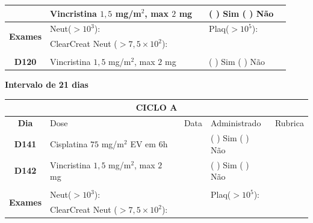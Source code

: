 \documentclass[11pt,a4paper,oldfontcommands]{memoir}
\begin{document}
\begin{center}
\begin{longtable}{p{1cm}p{6cm}|p{1cm}|p{3cm}|p{2.5cm}}
    \multicolumn{1}{c|}{\multirow{1}{*}{\textbf{}}}&{Vincristina \(1,5\) mg/m\(^2\), max \(2\) mg}&&{(  ) Sim (  ) Não}&\\
    \hline
    \multicolumn{1}{c|}{\multirow{2}{*}{\textbf{Exames}}}&\multicolumn{2}{l|}{Neut(\(>10^3\)):}&{Plaq(\(>10^5\)):}&\\
    \cline{2-5}
    \multicolumn{1}{c|}{\multirow{2}{*}{{}}}&\multicolumn{2}{l|}{ClearCreat Neut (\(>7,5\times10^2\)):}&{}&{}\\
    \hline
    \\
    \hline
    \multicolumn{1}{c|}{\multirow{1}{*}{\textbf{D120}}}&{Vincristina \(1,5\) mg/m\(^2\), max \(2\) mg}&&{(  ) Sim (  ) Não}&\\
    \hline
\end{longtable}
\textbf{Intervalo de 21 dias}
\begin{longtable}{p{1cm}p{6cm}|p{1cm}|p{3cm}|p{2.5cm}}
	\hline
	\multicolumn{5}{c}{\textbf{CICLO A}}\\
\hline
    \multicolumn{1}{c|}{\multirow{1}{*}{\textbf{Dia}}}&{Dose}&{Data}&{Administrado}&{Rubrica} \\
    \hline
    \multicolumn{1}{c|}{\multirow{1}{*}{\textbf{D141}}}&{Cisplatina \(75\) mg/m\(^2\) EV em 6h}&&{(  ) Sim (  ) Não}&\\
    \multicolumn{1}{c|}{\multirow{1}{*}{\textbf{D142}}}&{Vincristina \(1,5\) mg/m\(^2\), max \(2\) mg}&&{(  ) Sim (  ) Não}&\\
    \multicolumn{1}{c|}{\multirow{1}{*}{\textbf{}}}&&&&\\
    \hline
    \multicolumn{1}{c|}{\multirow{2}{*}{\textbf{Exames}}}&\multicolumn{2}{l|}{Neut(\(>10^3\)):}&{Plaq(\(>10^5\)):}&\\
    \cline{2-5}
    \multicolumn{1}{c|}{\multirow{2}{*}{{}}}&\multicolumn{2}{l|}{ClearCreat Neut (\(>7,5\times10^2\)):}&{}&{}\\
    \hline


\end{longtable}
\end{center}
\end{document}
